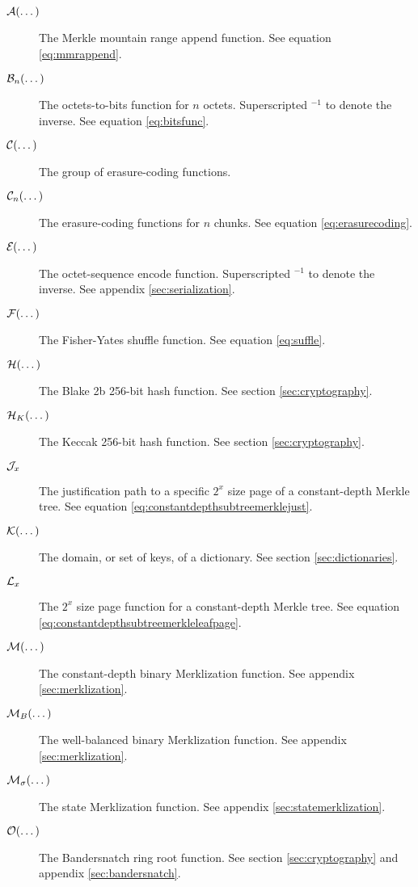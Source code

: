 \begin{description}
  \item[$\mathcal{A}(\dots)$] The Merkle mountain range append function. See equation \ref{eq:mmrappend}.
  \item[$\mathcal{B}_{n}(\dots)$] The octets-to-bits function for $n$ octets. Superscripted ${}^{-1}$ to denote the inverse. See equation \ref{eq:bitsfunc}.
  \item[$\mathcal{C}(\dots)$] The group of erasure-coding functions.
  \item[$\mathcal{C}_{n}(\dots)$] The erasure-coding functions for $n$ chunks. See equation \ref{eq:erasurecoding}.
  \item[$\encode{\dots}$] The octet-sequence encode function. Superscripted ${}^{-1}$ to denote the inverse. See appendix \ref{sec:serialization}.
  \item[$\mathcal{F}(\dots)$] The Fisher-Yates shuffle function. See equation \ref{eq:suffle}.
  \item[$\blake{\dots}$] The Blake 2b 256-bit hash function. See section \ref{sec:cryptography}.
  \item[$\keccak{\dots}$] The Keccak 256-bit hash function. See section \ref{sec:cryptography}.
  \item[$\mathcal{J}_{x}$] The justification path to a specific $2^x$ size page of a constant-depth Merkle tree. See equation \ref{eq:constantdepthsubtreemerklejust}.
  \item[$\keys{\dots}$] The domain, or set of keys, of a dictionary. See section \ref{sec:dictionaries}.
  \item[$\mathcal{L}_{x}$] The $2^x$ size page function for a constant-depth Merkle tree. See equation \ref{eq:constantdepthsubtreemerkleleafpage}.
  \item[$\merklizecd{\dots}$] The constant-depth binary Merklization function. See appendix \ref{sec:merklization}.
  \item[$\merklizewb{\dots}$] The well-balanced binary Merklization function. See appendix \ref{sec:merklization}.
  \item[$\merklizestate{\dots}$] The state Merklization function. See appendix \ref{sec:statemerklization}.
  \item[$\getringroot{\dots}$] The Bandersnatch ring root function. See section \ref{sec:cryptography} and appendix \ref{sec:bandersnatch}.

\end{description}
